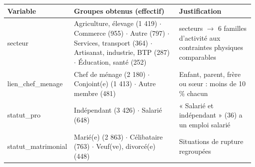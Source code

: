 \documentclass[

  french,

  10pt,

  a4paper,

]{article}
\newcounter{none} %
\begin{document}
{\def\LTcaptype{none} %

\begin{longtable}[]{@{}

  >{\raggedright\arraybackslash}p{}

  >{\raggedright\arraybackslash}p{}

  >{\raggedright\arraybackslash}p{}@{}}

\toprule\noalign{}

\begin{minipage}[b]{\linewidth}\raggedright

Variable

\end{minipage} & \begin{minipage}[b]{\linewidth}\raggedright

Groupes obtenus (effectif)

\end{minipage} & \begin{minipage}[b]{\linewidth}\raggedright

Justification

\end{minipage} \\

\midrule\noalign{}

\endhead

\bottomrule\noalign{}

\endlastfoot

secteur & Agriculture, élevage (1 419) \ensuremath{\cdot} Commerce (955) \ensuremath{\cdot} Autre (797) \ensuremath{\cdot} Services, transport (364) \ensuremath{\cdot} Artisanat, industrie, BTP (287) \ensuremath{\cdot} Éducation, santé (252) & 25 secteurs \ensuremath{\rightarrow} 6 familles d'activité aux contraintes physiques comparables \\

lien\_chef\_menage & Chef de ménage (2 180) \ensuremath{\cdot} Conjoint(e) (1 413) \ensuremath{\cdot} Autre membre (481) & Enfant, parent, frère ou sœur : moins de 10 \% chacun \\

statut\_pro & Indépendant (3 426) \ensuremath{\cdot} Salarié (648) & « Salarié et indépendant » (36) a un emploi salarié \\

statut\_matrimonial & Marié(e) (2 863) \ensuremath{\cdot} Célibataire (763) \ensuremath{\cdot} Veuf(ve), divorcé(e) (448) & Situations de rupture regroupées \\


\end{longtable}}
\end{document}
